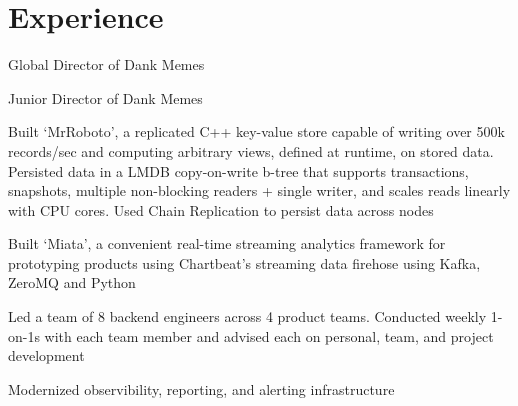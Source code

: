 \documentclass[]{resume-openfont}
\begin{document}
{}

\section{Experience}
    \begin{tightemize}
        \item
            Global Director of Dank Memes
    \end{tightemize}

    \begin{tightemize}
        \item
            Junior Director of Dank Memes
    \end{tightemize}

    \begin{tightemize}
        \item
            Built `MrRoboto', a replicated C++ key-value store capable of
            writing over 500k records/sec and computing arbitrary views,
            defined at runtime, on stored data. Persisted data in a LMDB
            copy-on-write b-tree that supports transactions, snapshots,
            multiple non-blocking readers + single writer, and scales reads
            linearly with CPU cores. Used Chain Replication to persist data
            across nodes
        \item
            Built `Miata', a convenient real-time streaming analytics framework
            for prototyping products using Chartbeat's streaming data firehose
            using Kafka, ZeroMQ and Python
        \item
            Led a team of 8 backend engineers across 4 product teams. Conducted
            weekly 1-on-1s with each team member and advised each on personal,
            team, and project development
        \item
            Modernized observibility, reporting, and alerting infrastructure
    \end{tightemize}
    \vspace{5pt}
\end{document}

